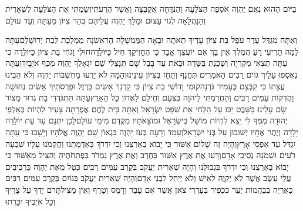 \documentclass[../main/main.tex]{subfiles}
\begin{document}
\begin{multicols*}{\ncols}
בַּיּוֹם הַהוּא נְאֻם יַהְוֶה אֹסְפָה הַצֹּלֵעָה וְהַנִּדָּחָה אֲקַבֵּצָה וַאֲשֶׁר הֲרֵעֹתִי\PreVerseSpace{}וְשַׂמְתִּי אֶת הַצֹּלֵעָה לִשְׁאֵרִית וְהַנַּהֲלָאָה לְגוֹי עָצוּם וּמָלַךְ יַהְוֶה עֲלֵיהֶם בְּהַר צִיּוֹן מֵעַתָּה וְעַד עוֹלָם\OpenSection{}\par
{}וְאַתָּה מִגְדַּל עֵדֶר עֹפֶל בַּת צִיּוֹן עָדֶיךָ תֵאתֶה וּבָאָה הַמֶּמְשָׁלָה הָרִאשֹׁנָה מַמְלֶכֶת לְבַת יְרוּשָׁלֵם\PreVerseSpace{}עַתָּה לָמָּה תָרִיעִי רֵעַ הֲמֶלֶךְ אֵין בָּךְ אִם יוֹעֲצֵךְ אָבָד כִּי הֶחֱזִיקֵךְ חִיל כַּיּוֹלֵדָה\PreVerseSpace{}חוּלִי וָגֹחִי בַּת צִיּוֹן כַּיּוֹלֵדָה כִּי עַתָּה תֵצְאִי מִקִּרְיָה וְשָׁכַנְתְּ בַּשָּׂדֶה וּבָאת עַד בָּבֶל שָׁם תִּנָּצֵלִי שָׁם יִגְאָלֵךְ יַהְוֶה מִכַּף אֹיְבָיִךְ\PreVerseSpace{}וְעַתָּה נֶאֶסְפוּ עָלַיִךְ גּוֹיִם רַבִּים הָאֹמְרִים תֶּחֱנָף וְתַחַז בְּצִיּוֹן עֵינֵינוּ\PreVerseSpace{}וְהֵמָּה לֹא יָדְעוּ מַחְשְׁבוֹת יַהְוֶה וְלֹא הֵבִינוּ עֲצָתוֹ כִּי קִבְּצָם כֶּעָמִיר גֹּרְנָה\PreVerseSpace{}קוּמִי וָדוֹשִׁי בַת צִיּוֹן כִּי קַרְנֵךְ אָשִׂים בַּרְזֶל וּפַרְסֹתַיִךְ אָשִׂים נְחוּשָׁה וַהֲדִקּוֹת עַמִּים רַבִּים וְהַחֲרַמְתִּי לַיהוָה בִּצְעָם וְחֵילָם לַאֲדוֹן כָּל הָאָרֶץ\PreVerseSpace{}עַתָּה תִּתְגֹּדְדִי בַת גְּדוּד מָצוֹר שָׂם עָלֵינוּ בַּשֵּׁבֶט יַכּוּ עַל הַלְּחִי אֵת שֹׁפֵט יִשְׂרָאֵל \ClosedSection{}וְאַתָּה בֵּית לֶחֶם אֶפְרָתָה צָעִיר לִהְיוֹת בְּאַלְפֵי יְהוּדָה מִמְּךָ לִי יֵצֵא לִהְיוֹת מוֹשֵׁל בְּיִשְׂרָאֵל וּמוֹצָאֹתָיו מִקֶּדֶם מִימֵי עוֹלָם\PreVerseSpace{}לָכֵן יִתְּנֵם עַד עֵת יוֹלֵדָה יָלָדָה וְיֶתֶר אֶחָיו יְשׁוּבוּן עַל בְּנֵי יִשְׂרָאֵל\PreVerseSpace{}וְעָמַד וְרָעָה בְּעֹז יַהְוֶה בִּגְאוֹן שֵׁם יַהְוֶה אֱלֹהָיו וְיָשָׁבוּ כִּי עַתָּה יִגְדַּל עַד אַפְסֵי אָרֶץ\PreVerseSpace{}וְהָיָה זֶה שָׁלוֹם אַשּׁוּר כִּי יָבוֹא בְאַרְצֵנוּ וְכִי יִדְרֹךְ בְּאַדְמָתֵנוּ\SubEnd{} וַהֲקֵמֹנוּ עָלָיו שִׁבְעָה רֹעִים וּשְׁמֹנָה נְסִיכֵי אָדָם\PreVerseSpace{}וְרָעוּ אֶת אֶרֶץ אַשּׁוּר בַּחֶרֶב וְאֶת אֶרֶץ נִמְרֹד בִּפְתִחֹתֶיהָ\SubEnd{} וְהִצִּיל מֵאַשּׁוּר כִּי יָבוֹא בְאַרְצֵנוּ וְכִי יִדְרֹךְ בִּגְבוּלֵנוּ \ClosedSection{}וְהָיָה שְׁאֵרִית יַעֲקֹב בְּקֶרֶב עַמִּים רַבִּים כְּטַל מֵאֵת יַהְוֶה כִּרְבִיבִים עֲלֵי עֵשֶׂב אֲשֶׁר לֹא יְקַוֶּה לְאִישׁ וְלֹא יְיַחֵל לִבְנֵי אָדָם\PreVerseSpace{}וְהָיָה שְׁאֵרִית יַעֲקֹב בַּגּוֹיִם בְּקֶרֶב עַמִּים רַבִּים כְּאַרְיֵה בְּבַהֲמוֹת יַעַר כִּכְפִיר בְּעֶדְרֵי צֹאן אֲשֶׁר אִם עָבַר וְרָמַס וְטָרַף וְאֵין מַצִּיל\PreVerseSpace{}תָּרֹם יָדְךָ עַל צָרֶיךָ וְכָל אֹיְבֶיךָ יִכָּרֵתוּ\OpenSection{}\par

\end{multicols*}
\end{document}

